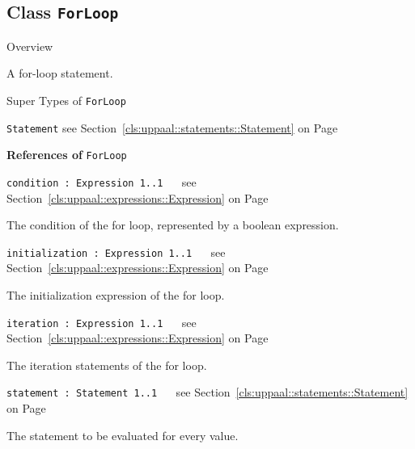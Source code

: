 \subsection{Class \bfseries \texttt{ForLoop}\normalfont}
\label{cls:uppaal::statements::ForLoop} 
	
	\begin{longdescription}
		\item[Overview] 		
				

	

		A for-loop statement.		
		\item[Super Types of \texttt{ForLoop}] ~
			\begin{longdescription}
				\item[\texttt{Statement}] see Section~\ref{cls:uppaal::statements::Statement} on Page~\pageref{cls:uppaal::statements::Statement}						\end{longdescription}
		
	
			\item[\textbf{References of} \texttt{ForLoop}] ~
			\begin{longdescription}
	\item[\texttt{condition : Expression 	\symbol{"5B}1..1\symbol{"5D}
}] ~
	see Section~\ref{cls:uppaal::expressions::Expression} on Page~\pageref{cls:uppaal::expressions::Expression}
	
	\nopagebreak
		
				

	

		The condition of the for loop, represented by a boolean expression.		
	\item[\texttt{initialization : Expression 	\symbol{"5B}1..1\symbol{"5D}
}] ~
	see Section~\ref{cls:uppaal::expressions::Expression} on Page~\pageref{cls:uppaal::expressions::Expression}
	
	\nopagebreak
		
				

	

		The initialization expression of the for loop.		
	\item[\texttt{iteration : Expression 	\symbol{"5B}1..1\symbol{"5D}
}] ~
	see Section~\ref{cls:uppaal::expressions::Expression} on Page~\pageref{cls:uppaal::expressions::Expression}
	
	\nopagebreak
		
				

	

		The iteration statements of the for loop.		
	\item[\texttt{statement : Statement 	\symbol{"5B}1..1\symbol{"5D}
}] ~
	see Section~\ref{cls:uppaal::statements::Statement} on Page~\pageref{cls:uppaal::statements::Statement}
	
	\nopagebreak
		
				

	

		The statement to be evaluated for every value.		
			\end{longdescription}
	
	\end{longdescription}
	

